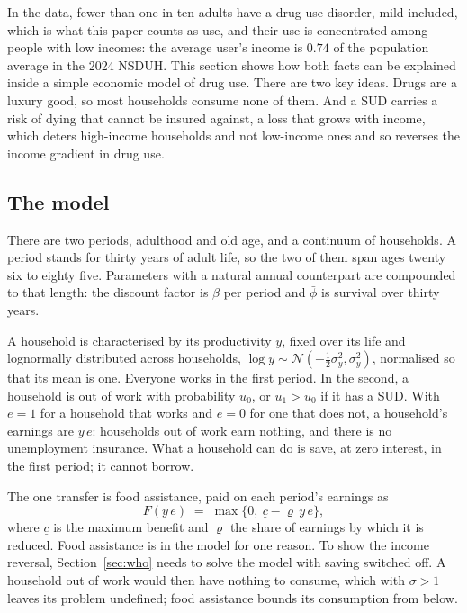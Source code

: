 \documentclass[10pt]{article}
\begin{document}
In the data, fewer than one in ten adults have a drug use disorder, mild included, which is what this paper counts as use, and their use is concentrated among people with low incomes: the average user's income is $0.74$ of the population average in the 2024 NSDUH. This section shows how both facts can be explained inside a simple economic model of drug use. There are two key ideas. Drugs are a luxury good, so most households consume none of them. And a SUD carries a risk of dying that cannot be insured against, a loss that grows with income, which deters high-income households and not low-income ones and so reverses the income gradient in drug use.

\subsection{The model}\label{sec:env}

There are two periods, adulthood and old age, and a continuum of households. A period stands for
thirty years of adult life, so the two of them span ages twenty six to eighty five.
Parameters with a natural annual counterpart are compounded to that length: the
discount factor is $\beta$ per period and $\bar\phi$ is survival over thirty years.

A household is characterised by its productivity $y$, fixed over its life and lognormally distributed across households, $\log y \sim \mathcal{N}(-\tfrac12\sigma_y^2, \sigma_y^2)$, normalised so that its mean is one. Everyone works in the first period. In the second, a household is out of work with probability $u_0$, or $u_1>u_0$ if it has a SUD. With $e=1$ for a household that works and $e=0$ for one that does not, a household's earnings are $y\,e$: households out of work earn nothing, and there is no unemployment insurance. What a household can do is save, at zero interest, in the first period; it cannot borrow.

The one transfer is food assistance, paid on each period's earnings as
\begin{equation}\label{eq:fs}
F(y\,e) \;=\; \max\{0,\ \underline c-\varrho\, y\,e\},
\end{equation}
where $\underline c$ is the maximum benefit and $\varrho$ the share of earnings by which it is reduced. Food assistance is in the model for one reason. To show the income reversal, Section~\ref{sec:who} needs to solve the model with saving switched off. A household out of work would then have nothing to consume, which with $\sigma>1$ leaves its problem undefined; food assistance bounds its consumption from below.
\end{document}
